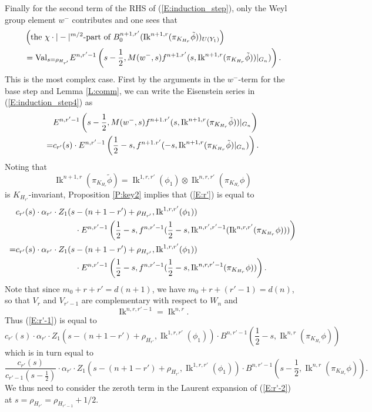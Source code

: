 \documentclass[10pt]{amsart}
\theoremstyle{plain}
\numberwithin{equation}{section}
\begin{document}
Finally for the
second term of the RHS of (\ref{E:induction_step}), 
only the Weyl
group element $w^-$ contributes and one sees that 
\begin{align}\label{E:induction_step4}
&\left(\text{the $\chi \cdot |-|^{m/2}$-part of $B_0^{n+1,
    r'}({\operatorname{Ik}}^{n+1,r}(\pi_{K_{H_r}}\tilde{\phi}))_{U(Y_1)}$}\right)\\
&={\operatorname{Val}}_{s=\rho_{H_{r'}}} E^{n, r'-1}\left( s - \frac{1}{2}, M(w^-,s)
f^{n+1. r'}(s, {\operatorname{Ik}}^{n+1,r}(\pi_{K_{H_r}}\tilde{\phi}))|_{G_n})\right)\notag.
 \end{align}
This is the most complex case. First by the arguments in the
$w^-$-term for the base step and Lemma \ref{L:comm}, we can write the
Eisenstein series in (\ref{E:induction_step4}) as
\begin{align} \label{E:r'}
&E^{n, r'-1}\left( s - \frac{1}{2}, M(w^-,s)
f^{n+1. r'}(s, {\operatorname{Ik}}^{n+1,r}(\pi_{K_{H_r}}\tilde{\phi}))|_{G_n}\right)\\
=&c_{r'}(s) \cdot E^{n, r'-1}\left(\frac{1}{2}-s, f^{n+1. r'}(-s,
  {\operatorname{Ik}}^{n+1,r}(\pi_{K_{H_r}}\tilde{\phi})|_{G_n})\right).\notag
\end{align}
 Noting that
\[  {\operatorname{Ik}}^{n+1, r}(\pi_{K_{H_r}} \tilde{\phi}) = {\operatorname{Ik}}^{1, r,r'}(\phi_1)
\otimes {\operatorname{Ik}}^{n,r,r'}(\pi_{K_{H_r}}\phi) \]
is $K_{H_{r'}}$-invariant,
 Proposition \ref{P:key2} implies that (\ref{E:r'}) is  equal to
\begin{align}\label{E:r'-1}   
&c_{r'}(s) \cdot \alpha_{r'} \cdot Z_1(s  -
(n+1-r') + \rho_{H_{r'}}, {\operatorname{Ik}}^{1,r,r'}(\phi_1))\\
&\hskip 1in \cdot E^{n,r'-1}\left(\frac{1}{2}-s, f^{n,
  r'-1}(\frac{1}{2}-s, 
{\operatorname{Ik}}^{n,r', r'-1}({\operatorname{Ik}}^{n,r,  r'}(\pi_{K_{H_r}}\phi)))\right)\notag\\
=& c_{r'}(s) \cdot \alpha_{r'} \cdot Z_1(s  -
(n+1-r') + \rho_{H_{r'}}, {\operatorname{Ik}}^{1,r,r'}(\phi_1))\notag\\
&\hskip 1in \cdot   E^{n,r'-1}\left(\frac{1}{2}-s, f^{n,
  r'-1}(\frac{1}{2}-s, {\operatorname{Ik}}^{n, r, r'-1}(\pi_{K_{H_r}} \phi))\right).\notag
\end{align}
Note that since $m_0+ r + r' = d(n+1)$, we have $m_0 + r+ (r'-1) =
d(n)$, so that $V_r$ and $V_{r'-1}$ are complementary with respect to
$W_n$ and 
\[  {\operatorname{Ik}}^{n,r, r'-1} = {\operatorname{Ik}}^{n,r}. \]
Thus (\ref{E:r'-1}) is equal to
\[  c_{r'}(s) \cdot \alpha_{r'} \cdot  Z_1(s  -
(n+1-r') + \rho_{H_{r'}}, {\operatorname{Ik}}^{1,r,r'}(\phi_1))  \cdot B^{n, r'-1}(\frac{1}{2}-s,
{\operatorname{Ik}}^{n,r}(\pi_{K_{H_r}}\phi)) \]
 which is in turn equal to
 \begin{equation}\label{E:r'-2}
 \frac{c_{r'}(s)}{c_{r'-1}(s - \frac{1}{2})} \cdot \alpha_{r'}
 \cdot Z_1(s  - (n+1-r') + \rho_{H_{r'}}, {\operatorname{Ik}}^{1,r,r'}(\phi_1))  \cdot
 B^{n, r'-1}(s-\frac{1}{2}, {\operatorname{Ik}}^{n,r}(\pi_{K_{H_r}}\phi)).
\end{equation}
 We thus need to consider the zeroth term in the Laurent expansion of (\ref{E:r'-2}) at
 $s = \rho_{H_{r'}} = \rho_{H_{r'-1}} + 1/2 $.
 \vskip 5pt
 
\end{document}
